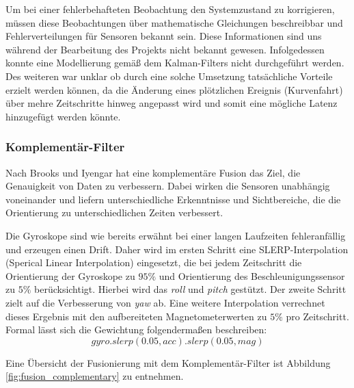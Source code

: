 Um bei einer fehlerbehafteten Beobachtung den Systemzustand zu korrigieren, müssen diese Beobachtungen über mathematische Gleichungen beschreibbar und Fehlerverteilungen für Sensoren bekannt sein. Diese Informationen sind uns während der Bearbeitung des Projekts nicht bekannt gewesen.
Infolgedessen konnte eine Modellierung gemäß dem Kalman-Filters nicht durchgeführt werden. 
Des weiteren war unklar ob durch eine solche Umsetzung tatsächliche Vorteile erzielt werden können, da die Änderung eines plötzlichen Ereignis (Kurvenfahrt) über mehre Zeitschritte hinweg angepasst wird und somit eine mögliche Latenz hinzugefügt werden könnte.

\subsubsection{Komplementär-Filter}
Nach Brooks und Iyengar \cite{Brooks.1998} hat eine komplementäre Fusion das Ziel, die Genauigkeit von Daten zu verbessern. 
Dabei wirken die Sensoren unabhängig voneinander und liefern unterschiedliche Erkenntnisse und Sichtbereiche, die die Orientierung zu unterschiedlichen Zeiten verbessert.

Die Gyroskope sind wie bereits erwähnt bei einer langen Laufzeiten fehleranfällig und erzeugen einen Drift. 
Daher wird im ersten Schritt eine SLERP-Interpolation (Sperical Linear Interpolation) eingesetzt, die bei jedem Zeitschritt die Orientierung der Gyroskope zu $95\%$ und Orientierung des Beschleunigungssensor zu $5\%$ berücksichtigt. Hierbei wird das \emph{roll} und \emph{pitch} gestützt. Der zweite Schritt zielt auf die Verbesserung von \emph{yaw} ab. Eine weitere Interpolation verrechnet dieses Ergebnis mit den aufbereiteten Magnetometerwerten zu $5\%$ pro Zeitschritt. Formal lässt sich die Gewichtung folgendermaßen beschreiben:
\begin{equation}
    gyro.slerp(0.05, acc).slerp(0.05, mag)
\end{equation}

Eine Übersicht der Fusionierung mit dem Komplementär-Filter ist Abbildung \ref{fig:fusion_complementary} zu entnehmen.

